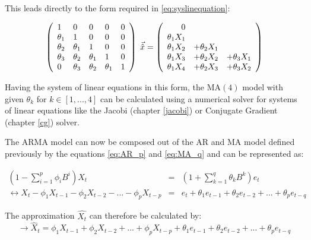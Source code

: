 This leads directly to the form required in \eqref{eq:syslinequation}:

\begin{equation}\label{eq:example_MA_three_system_3}
  \left(\begin{array}[c]{lllll}
    1 & 0 & 0 & 0 & 0\\
    \theta_1 & 1 & 0 & 0 & 0\\
    \theta_2 & \theta_1& 1 & 0 & 0\\
    \theta_3 & \theta_2 & \theta_1& 1 & 0\\
    0 & \theta_3 & \theta_2 & \theta_1& 1
  \end{array}\right) \;\vec{\hat{x}} =
  \left(\begin{array}[c]{rrr}
    0 &&\\ 
    \theta_1 X_{1} &&\\
      \theta_1 X_{2} &+ \theta_2 X_{1} &\\
      \theta_1 X_{3} &+ \theta_2 X_{2} &+ \theta_3 X_{1} \\
      \theta_1 X_{4} &+ \theta_2 X_{3} &+ \theta_3 X_{2} 
  \end{array}\right)
\end{equation}

Having the system of linear equations in this form, the \acs{MA}$(4)$ model with given $\theta_k$ for $k \in [1,...,4]$ can be calculated using a numerical solver for systems of linear equations like the Jacobi (chapter \ref{jacobi}) or Conjugate Gradient (chapter \ref{cg}) solver.

The \acs{ARMA} model can now be composed out of the \acl{AR} and \acl{MA} model defined previously by the equations \eqref{eq:AR_p} and \eqref{eq:MA_q} and can be represented as:

\begin{equation}\label{eq:ARMA_1}
\begin{array}{ccc}
  (1-\displaystyle\sum_{i=1}^{p} \phi_i B^i) X_t & = & (1+\displaystyle\sum_{k=1}^{q} \theta_k B^k)e_t\\
  \leftrightarrow X_t - \phi_1 X_{t-1} - \phi_2 X_{t-2} - ... - \phi_p X_{t-p} & = & e_t + \theta_1 e_{t-1}+ \theta_2 e_{t-2}+ ... + \theta_p e_{t-q}
  \end{array}
\end{equation}

The approximation $\hat{X_t}$ can therefore be calculated by:
\begin{equation}\label{eq:ARMA_2}
	\rightarrow  \hat{X}_t = \phi_1 X_{t-1} + \phi_2 X_{t-2} + ... + \phi_p X_{t-p} + \theta_1 e_{t-1}+ \theta_2 e_{t-2}+ ... + \theta_p e_{t-q}
\end{equation}


